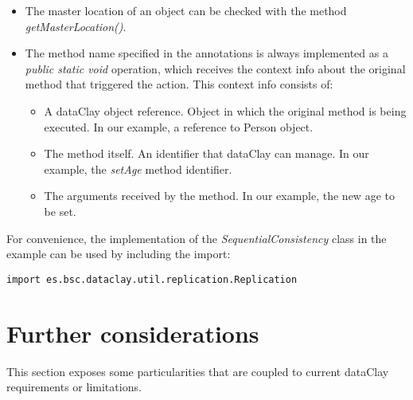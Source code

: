 \begin{itemize}
    \item The master location of an object can be checked with the method \textit{getMasterLocation()}.
    \item The method name specified in the annotations is always implemented as a \textit{public static void} operation, which receives the context info about the original method that triggered the action. This context info consists of:
 \begin{itemize}
    \item A dataClay object reference. Object in which the original method is being executed. In our example, a reference to Person object.
    \item The method itself. An identifier that dataClay can manage. In our example, the \textit{setAge} method identifier.
    \item The arguments received by the method. In our example, the new age to be set.
 \end{itemize}
\end{itemize}

For convenience, the implementation of the \textit{SequentialConsistency} class in the example can be used by including the import:

\colorbox{basecolor!20}{\texttt{import es.bsc.dataclay.util.replication.Replication}}

\FEDERATION{

}

\section{Further considerations}
\label{sec:JavaConsiderations}

This section exposes some particularities that are coupled to current dataClay requirements or limitations.

